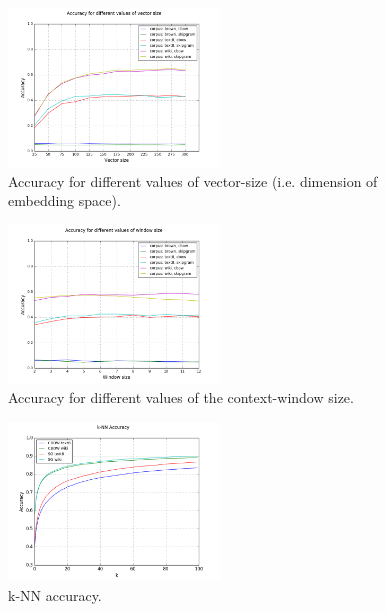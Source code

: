 \documentclass[conference]{IEEEtran}
\begin{document}
\begin{figure}[t]
\centering
\includegraphics[width=0.5\textwidth]{graph_acc_size}
\caption{Accuracy for different values of vector-size (i.e. dimension of embedding space). }
\label{fig:size}
\end{figure}

\begin{figure}[t]
\centering
\includegraphics[width=0.5\textwidth]{graph_acc_window}
\caption{Accuracy for different values of the context-window size. }
\label{fig:window}
\end{figure}

\begin{figure}[t]
\centering
\includegraphics[width=0.5\textwidth]{graph_knn-acc}
\caption{k-NN accuracy. }
\label{fig:knn}
\end{figure}

\label{sec:res}
\end{document}
